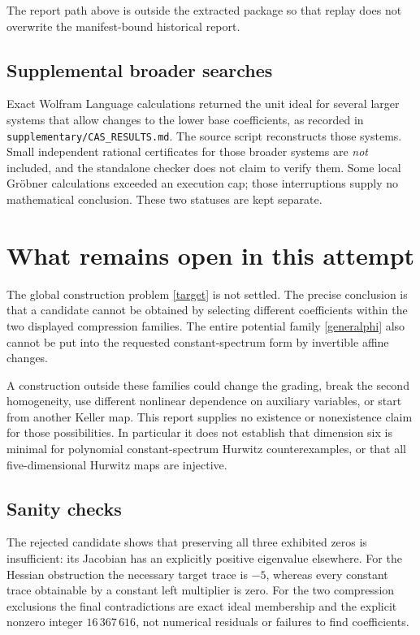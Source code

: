 \documentclass[11pt,a4paper]{article}
\theoremstyle{remark}\newtheorem{remark}[theorem]{Remark}
\begin{document}
The report path above is outside the extracted package so that replay does not
overwrite the manifest-bound historical report.

\subsection*{Supplemental broader searches}
Exact Wolfram Language calculations returned the unit ideal for several larger
systems that allow changes to the lower base coefficients, as recorded in
\texttt{supplementary/CAS\_RESULTS.md}. The source script reconstructs those
systems. Small independent rational certificates for those broader systems are
\emph{not} included, and the standalone checker does not claim to verify them.
Some local Gr\"obner calculations exceeded an execution cap; those interruptions
supply no mathematical conclusion. These two statuses are kept separate.

\section{What remains open in this attempt}
The global construction problem \eqref{target} is not settled. The precise
conclusion is that a candidate cannot be obtained by selecting different
coefficients within the two displayed compression families. The entire potential
family \eqref{generalphi} also cannot be put into the requested constant-spectrum
form by invertible affine changes.

A construction outside these families could change the grading, break the
second homogeneity, use different nonlinear dependence on auxiliary variables,
or start from another Keller map. This report supplies no existence or
nonexistence claim for those possibilities. In particular it does not establish
that dimension six is minimal for polynomial constant-spectrum Hurwitz
counterexamples, or that all five-dimensional Hurwitz maps are injective.

\subsection*{Sanity checks}
The rejected candidate shows that preserving all three exhibited zeros is
insufficient: its Jacobian has an explicitly positive eigenvalue elsewhere.
For the Hessian obstruction the necessary target trace is $-5$, whereas every
constant trace obtainable by a constant left multiplier is zero. For the two
compression exclusions the final contradictions are exact ideal membership and
the explicit nonzero integer $16\,367\,616$, not numerical residuals or failures
to find coefficients.
\end{document}
